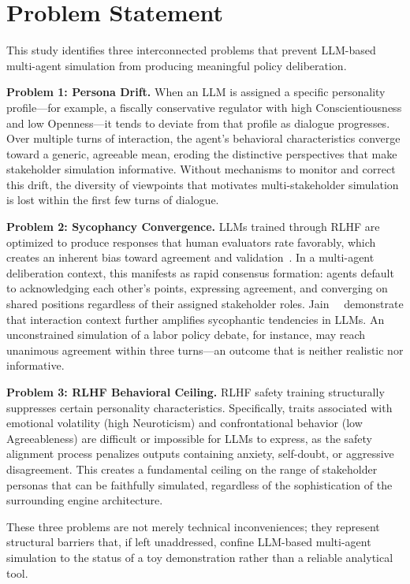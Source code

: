 \section{Problem Statement}

This study identifies three interconnected problems that prevent LLM-based multi-agent simulation from producing meaningful policy deliberation.

\textbf{Problem 1: Persona Drift.} When an LLM is assigned a specific personality profile---for example, a fiscally conservative regulator with high Conscientiousness and low Openness---it tends to deviate from that profile as dialogue progresses. Over multiple turns of interaction, the agent's behavioral characteristics converge toward a generic, agreeable mean, eroding the distinctive perspectives that make stakeholder simulation informative. Without mechanisms to monitor and correct this drift, the diversity of viewpoints that motivates multi-stakeholder simulation is lost within the first few turns of dialogue.

\textbf{Problem 2: Sycophancy Convergence.} LLMs trained through RLHF are optimized to produce responses that human evaluators rate favorably, which creates an inherent bias toward agreement and validation~\cite{wei2024sycophancy}. In a multi-agent deliberation context, this manifests as rapid consensus formation: agents default to acknowledging each other's points, expressing agreement, and converging on shared positions regardless of their assigned stakeholder roles. Jain~\etal~\cite{jain2026sycophancy} demonstrate that interaction context further amplifies sycophantic tendencies in LLMs. An unconstrained simulation of a labor policy debate, for instance, may reach unanimous agreement within three turns---an outcome that is neither realistic nor informative.

\textbf{Problem 3: RLHF Behavioral Ceiling.} RLHF safety training structurally suppresses certain personality characteristics. Specifically, traits associated with emotional volatility (high Neuroticism) and confrontational behavior (low Agreeableness) are difficult or impossible for LLMs to express, as the safety alignment process penalizes outputs containing anxiety, self-doubt, or aggressive disagreement. This creates a fundamental ceiling on the range of stakeholder personas that can be faithfully simulated, regardless of the sophistication of the surrounding engine architecture.

These three problems are not merely technical inconveniences; they represent structural barriers that, if left unaddressed, confine LLM-based multi-agent simulation to the status of a toy demonstration rather than a reliable analytical tool.


